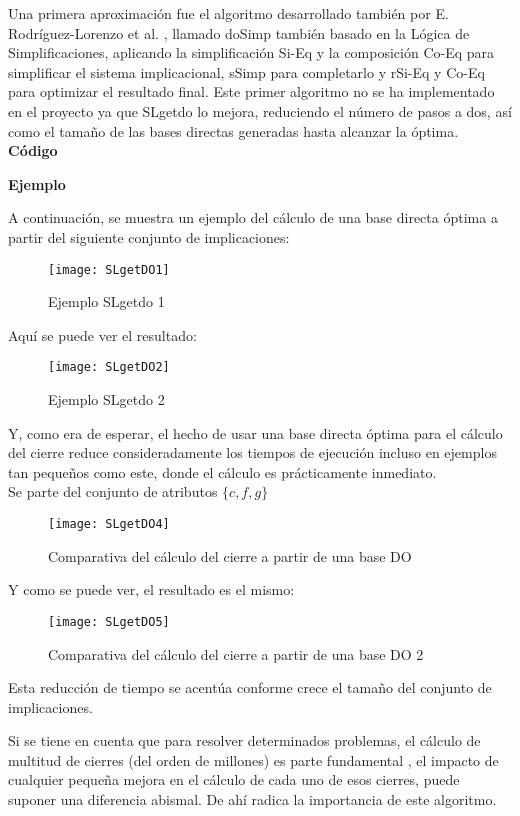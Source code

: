 Una primera aproximaci\'on  fue el algoritmo desarrollado tambi\'en por E. Rodr\'iguez-Lorenzo et al. \cite{doSimp}, llamado doSimp tambi\'en basado en la L\'ogica de Simplificaciones, aplicando la simplificaci\'on Si-Eq y la composici\'on Co-Eq para simplificar el sistema implicacional, sSimp para completarlo y rSi-Eq y Co-Eq para optimizar el resultado final. Este primer algoritmo no se ha implementado en el proyecto ya que SLgetdo lo mejora, reduciendo el n\'umero de pasos a dos, as\'i como el tama\~no de las bases directas generadas hasta alcanzar la \'optima.
\newpage
\textbf{C\'odigo} 

\newpage

\newpage
\textbf{Ejemplo} 

A continuaci\'on, se muestra un ejemplo del c\'alculo de una base directa \'optima a partir del siguiente conjunto de implicaciones: 
\begin{figure}[H]
    \centering
    \texttt{[image: SLgetDO1]}
    \caption{Ejemplo SLgetdo 1}
    \label{fig:SLgetDO1}
\end{figure} 

Aqu\'i se puede ver el resultado:
\begin{figure}[H]
    \centering
    \texttt{[image: SLgetDO2]}
    \caption{Ejemplo SLgetdo 2}
    \label{fig:SLgetDO2}
\end{figure} 
Y, como era de esperar, el hecho de usar una base directa \'optima para el c\'alculo del cierre reduce consideradamente los tiempos de ejecuci\'on incluso en ejemplos tan peque\~nos como este, donde el c\'alculo es pr\'acticamente inmediato.\\

Se parte del conjunto de atributos \(\{c,f,g\}\)

\begin{figure}[H]
    \centering
    \texttt{[image: SLgetDO4]}
    \caption{Comparativa del c\'alculo del cierre a partir de una base DO}
    \label{fig:SLgetDO4}
\end{figure}

Y como se puede ver, el resultado es el mismo:
\begin{figure}[H]
    \centering
    \texttt{[image: SLgetDO5]}
    \caption{Comparativa del c\'alculo del cierre a partir de una base DO 2}
    \label{fig:SLgetDO5}
\end{figure}

Esta reducci\'on de tiempo se acent\'ua conforme crece el tama\~no del conjunto de implicaciones.

Si se tiene en cuenta que para resolver determinados problemas, el c\'alculo de multitud de cierres (del orden de millones) es parte fundamental \cite{Adaricheva}, el impacto de cualquier peque\~na mejora en el c\'alculo de cada uno de esos cierres, puede suponer una diferencia abismal. De ah\'i radica la importancia de este algoritmo.

